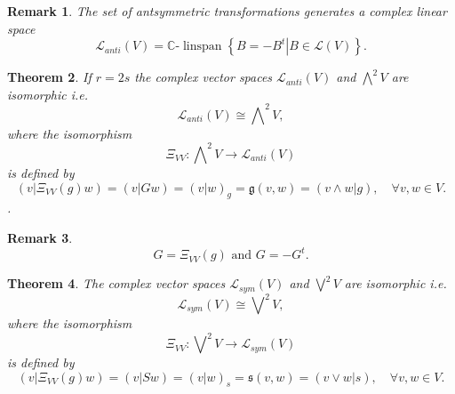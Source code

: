 \documentclass[aps,preprint]{revtex4}%
\newtheorem{theorem}{Theorem}
\newtheorem{remark}[theorem]{Remark}
\begin{document}
\begin{remark}
The set of antsymmetric transformations generates a complex linear space%
\begin{equation}
\mathcal{L}_{anti}\left(  V\right)  =\mathbb{C}\text{-}\operatorname*{linspan}%
\left\{  \left.  B=-B^{t}\right\vert B\in\mathcal{L}\left(  V\right)
\right\}  .
\end{equation}

\end{remark}

\begin{theorem}
If $r=2s$ the complex vector spaces $\mathcal{L}_{anti}\left(  V\right)  $ and
$\bigwedge\nolimits^{2}V$ are isomorphic i.e.
\begin{equation}
\mathcal{L}_{anti}\left(  V\right)  \cong\bigwedge\nolimits^{2}V,
\end{equation}
where the isomorphism
\begin{equation}
\Xi_{VV}:\bigwedge\nolimits^{2}V\rightarrow\mathcal{L}_{anti}\left(  V\right)
\end{equation}
is defined by
\begin{equation}
\left(  \left.  v\right\vert \Xi_{VV}\left(  g\right)  w\right)  =\left(
\left.  v\right\vert Gw\right)  =\left(  \left.  v\right\vert w\right)
_{g}=\mathfrak{g}\left(  v,w\right)  =\left(  \left.  v\wedge w\right\vert
g\right)  ,\quad\forall v,w\in V.
\end{equation}
.
\end{theorem}

\begin{remark}%
\begin{equation}
G=\Xi_{VV}\left(  g\right)  \text{ and }G=-G^{t}.
\end{equation}

\end{remark}

\begin{theorem}
The complex vector spaces $\mathcal{L}_{sym}\left(  V\right)  $ and
$\bigvee\nolimits^{2}V$ are isomorphic i.e.
\begin{equation}
\mathcal{L}_{sym}\left(  V\right)  \cong\bigvee\nolimits^{2}V,
\end{equation}
where the isomorphism
\begin{equation}
\Xi_{VV}:\bigvee\nolimits^{2}V\rightarrow\mathcal{L}_{sym}\left(  V\right)
\end{equation}
is defined by
\begin{equation}
\left(  \left.  v\right\vert \Xi_{VV}\left(  g\right)  w\right)  =\left(
\left.  v\right\vert Sw\right)  =\left(  \left.  v\right\vert w\right)
_{s}=\mathfrak{s}\left(  v,w\right)  =\left(  \left.  v\vee w\right\vert
s\right)  ,\quad\forall v,w\in V.
\end{equation}

\end{theorem}
\end{document}

